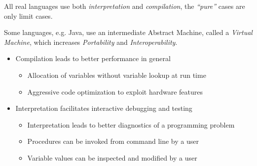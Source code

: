 All real languages use both \textit{interpretation} and \textit{compilation}, the \textit{``pure''} cases are only limit cases.

Some languages, e.g. Java, use an intermediate Abstract Machine, called a \textit{Virtual Machine},
which increases \textit{Portability} and \textit{Interoperability}.

\begin{itemize}
	\item Compilation leads to better performance in general
	    \begin{itemize}
		    \item Allocation of variables without variable lookup at run time
		    \item Aggressive code optimization to exploit hardware features
	    \end{itemize}
	\item Interpretation facilitates interactive debugging and testing
	    \begin{itemize}
		    \item Interpretation leads to better diagnostics of a programming problem
		    \item Procedures can be invoked from command line by a user
		    \item Variable values can be inspected and modified by a user
	    \end{itemize}
\end{itemize}
